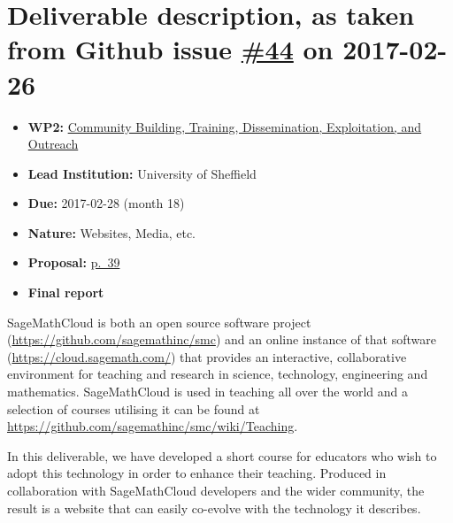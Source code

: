\section*{\texorpdfstring{Deliverable description, as taken from Github
issue
\href{https://github.com/OpenDreamKit/OpenDreamKit/issues/44}{\#44} on
2017-02-26}{Deliverable description, as taken from Github issue \#44 on 2017-02-26}}\label{deliverable-description-as-taken-from-github-issue-44-on-2017-02-26}

\begin{itemize}
\tightlist
\item
  \textbf{WP2:}
  \href{https://github.com/OpenDreamKit/OpenDreamKit/tree/master/WP2}{Community
  Building, Training, Dissemination, Exploitation, and Outreach}
\item
  \textbf{Lead Institution:} University of Sheffield
\item
  \textbf{Due:} 2017-02-28 (month 18)
\item
  \textbf{Nature:} Websites, Media, etc.
\item
  \textbf{Proposal:}
  \href{https://github.com/OpenDreamKit/OpenDreamKit/raw/master/Proposal/proposal-www.pdf}{p.~39}
\item
  \textbf{Final report}
\end{itemize}

SageMathCloud is both an open source software project
(\url{https://github.com/sagemathinc/smc}) and an online instance of
that software (\url{https://cloud.sagemath.com/}) that provides an
interactive, collaborative environment for teaching and research in
science, technology, engineering and mathematics. SageMathCloud is used
in teaching all over the world and a selection of courses utilising it
can be found at \url{https://github.com/sagemathinc/smc/wiki/Teaching}.

In this deliverable, we have developed a short course for educators who
wish to adopt this technology in order to enhance their teaching.
Produced in collaboration with SageMathCloud developers and the wider
community, the result is a website that can easily co-evolve with the
technology it describes.

